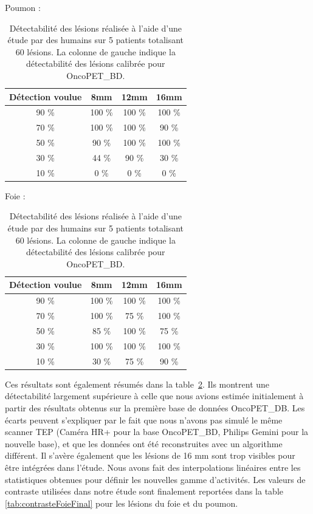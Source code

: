 \begin{table}
\centering
Poumon :\\
\begin{tabular}{|c|c|c|c|}
 \hline
 Détection voulue & 	8mm & 	12mm & 	16mm \\
\hline
90 \%		  & 100 \%  & 100 \% & 100 \% \\
\hline
70 \%		  & 100 \%  & 100 \% & 90 \%\\
\hline
50 \%		  & 90 \%  & 100 \% & 100 \%\\
\hline
30 \%		  & 44 \%  & 90 \% & 30 \%\\
\hline
10 \% 		  & 0 \%  & 0 \% & 0 \%\\
\hline
\end{tabular}

\vspace{0.5cm}

Foie :\\
\begin{tabular}{|c|c|c|c|}
 \hline
 Détection voulue & 	8mm & 	12mm & 	16mm \\
\hline
90 \%		  & 100 \%  & 100 \% & 100 \% \\
\hline
70 \%		  & 100 \%  & 75 \% & 100 \%\\
\hline
50 \%		  & 85 \%  & 100 \% & 75 \%\\
\hline
30 \%		  & 100 \%  & 100 \% & 100 \%\\
\hline
10 \% 		  & 30 \%  & 75 \% & 90 \%\\
\hline
\end{tabular}
\caption[Détectabilité estimée des lésions en fonction du contraste et de leur diamètre]{Détectabilité des lésions réalisée à l'aide d'une étude par des humains sur 5 patients totalisant 60 lésions. La colonne de gauche indique la détectabilité des lésions calibrée pour OncoPET\_BD.}
\label{fig:detectabiliteVue}
\end{table}

Ces résultats sont également résumés dans la table~\ref{fig:detectabiliteVue}. Ils montrent une détectabilité largement supérieure à celle que nous avions estimée initialement à partir des résultats obtenus sur la première base de données OncoPET\_DB. Les écarts peuvent s'expliquer par le fait que nous n'avons pas simulé le même scanner TEP (Caméra HR+ pour la base OncoPET\_BD, Philips Gemini pour la nouvelle base), et que les données ont été reconstruites avec un algorithme différent. Il s'avère également que les lésions de 16 mm sont trop visibles pour être intégrées dans l'étude. Nous avons fait des interpolations linéaires entre les statistiques obtenues pour définir les nouvelles gamme d'activités. Les valeurs de contraste utilisées dans notre étude sont finalement reportées dans la table \ref{tab:contrasteFoieFinal} pour les lésions du foie et du poumon.




